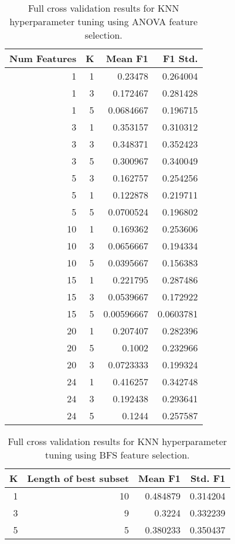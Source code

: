 \documentclass{article}
\begin{document}
\begin{table}[H]
\centering
\caption{Full cross validation results for KNN hyperparameter tuning using ANOVA feature selection.}
\label{tab:knn-anova-full}
\begin{tabular}{rrrr}
\hline
   Num Features &   K &    Mean F1 &   F1 Std. \\
\hline
              1 &   1 & 0.23478    & 0.264004  \\
              1 &   3 & 0.172467   & 0.281428  \\
              1 &   5 & 0.0684667  & 0.196715  \\
              3 &   1 & 0.353157   & 0.310312  \\
              3 &   3 & 0.348371   & 0.352423  \\
              3 &   5 & 0.300967   & 0.340049  \\
              5 &   3 & 0.162757   & 0.254256  \\
              5 &   1 & 0.122878   & 0.219711  \\
              5 &   5 & 0.0700524  & 0.196802  \\
             10 &   1 & 0.169362   & 0.253606  \\
             10 &   3 & 0.0656667  & 0.194334  \\
             10 &   5 & 0.0395667  & 0.156383  \\
             15 &   1 & 0.221795   & 0.287486  \\
             15 &   3 & 0.0539667  & 0.172922  \\
             15 &   5 & 0.00596667 & 0.0603781 \\
             20 &   1 & 0.207407   & 0.282396  \\
             20 &   5 & 0.1002     & 0.232966  \\
             20 &   3 & 0.0723333  & 0.199324  \\
             24 &   1 & 0.416257   & 0.342748  \\
             24 &   3 & 0.192438   & 0.293641  \\
             24 &   5 & 0.1244     & 0.257587  \\
\hline
\end{tabular}
\end{table}

\begin{table}[H]
\centering
\caption{Full cross validation results for KNN hyperparameter tuning using BFS feature selection.}
\label{tab:knn-bfs-full}
\begin{tabular}{rrrr}
\hline
   K &   Length of best subset &   Mean F1 &   Std. F1 \\
\hline
   1 &                      10 &  0.484879 &  0.314204 \\
   3 &                       9 &  0.3224   &  0.332239 \\
   5 &                       5 &  0.380233 &  0.350437 \\
\hline
\end{tabular}
\end{table}
\end{document}
